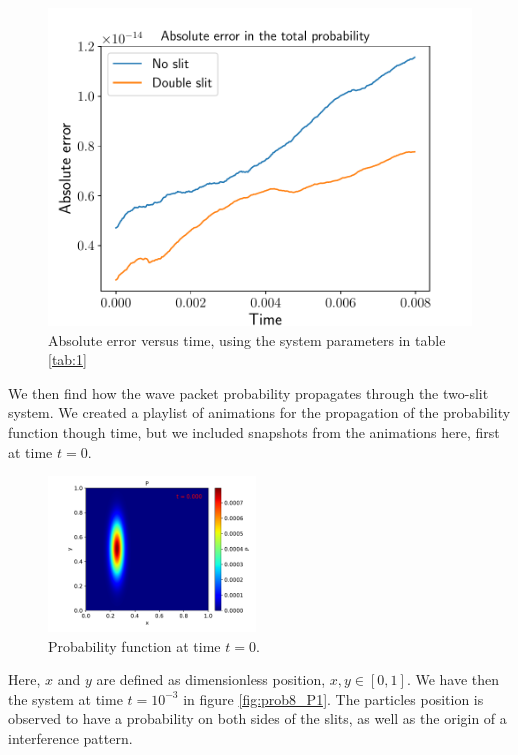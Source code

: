 \documentclass[english,notitlepage,reprint,nofootinbib]{revtex4-2}  %
\begin{document}
	\begin{figure}[H]
		\centering
		\includegraphics[scale=0.55]{figures/problem7_error.pdf}
		\caption{Absolute error versus time, using the system parameters in table \ref{tab:1}}
		\label{fig:prob7_error}
	\end{figure}
	We then find how the wave packet probability propagates through the two-slit system. We created a playlist of animations for the propagation of the probability function though time,  but we included snapshots from the animations here, first at time $t=0$.

	\begin{figure}[H]
		\centering
		\includegraphics[width=0.49\textwidth]{figures/problem8_P_0.000.pdf}
		\caption{Probability function at time $t=0$.}
		\label{fig:prob_P0}
	\end{figure}
	Here, $x$ and $y$ are defined as dimensionless position, $x, y\in[0, 1]$. We have then the system at time $t = 10^{-3}$ in figure \ref{fig:prob8_P1}. The particles position is observed to have a probability on both sides of the slits, as well as the origin of a interference pattern.
\end{document}
